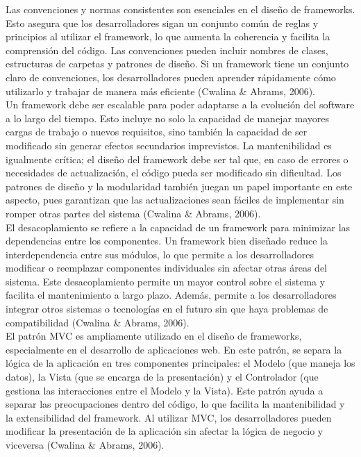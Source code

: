 \documentclass[12pt,letterpaper,spanish, xcolor=table]{report}
\numberwithin{figure}{subsection}
\begin{document}
Las convenciones y normas consistentes son esenciales en el diseño de frameworks. Esto asegura que los desarrolladores sigan un conjunto común de reglas y principios al utilizar el framework, lo que aumenta la coherencia y facilita la comprensión del código. Las convenciones pueden incluir nombres de clases, estructuras de carpetas y patrones de diseño. Si un framework tiene un conjunto claro de convenciones, los desarrolladores pueden aprender rápidamente cómo utilizarlo y trabajar de manera más eficiente (Cwalina 
\& Abrams, 2006).\\

Un framework debe ser escalable para poder adaptarse a la evolución del software a lo largo del tiempo. Esto incluye no solo la capacidad de manejar mayores cargas de trabajo o nuevos requisitos, sino también la capacidad de ser modificado sin generar efectos secundarios imprevistos. La mantenibilidad es igualmente crítica; el diseño del framework debe ser tal que, en caso de errores o necesidades de actualización, el código pueda ser 
modificado sin dificultad. Los patrones de diseño y la modularidad también juegan un papel importante en este aspecto, pues garantizan que las actualizaciones sean fáciles de implementar sin romper otras partes del sistema (Cwalina \& Abrams, 2006).\\

El desacoplamiento se refiere a la capacidad de un framework para minimizar las dependencias entre los componentes. Un framework bien diseñado reduce la 
interdependencia entre sus módulos, lo que permite a los desarrolladores modificar o reemplazar componentes individuales sin afectar otras áreas del sistema. Este desacoplamiento permite un mayor control sobre el sistema y facilita el mantenimiento a largo plazo. Además, permite a los desarrolladores integrar otros sistemas o tecnologías en el futuro sin que haya problemas de compatibilidad (Cwalina \& Abrams, 2006).\\

El patrón MVC es ampliamente utilizado en el diseño de frameworks, especialmente en el desarrollo de aplicaciones web. En este patrón, se separa la lógica de la aplicación en tres componentes principales: el Modelo (que maneja los datos), la Vista (que se encarga de la presentación) y el Controlador (que gestiona las interacciones entre el Modelo y la Vista). 
Este patrón ayuda a separar las preocupaciones dentro del código, lo que facilita la mantenibilidad y la extensibilidad del framework. Al utilizar MVC, los desarrolladores pueden modificar la presentación de la aplicación sin afectar la lógica de negocio y viceversa (Cwalina \& Abrams, 2006).\\
\end{document}

